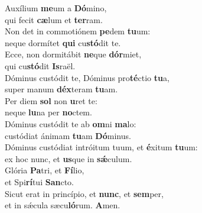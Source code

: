 \evenverse Auxílium \textbf{me}um a \textbf{Dó}mino,~\*\\
\evenverse qui fecit \textbf{cæ}lum et \textbf{ter}ram.\\
\oddverse Non det in commotiónem \textbf{pe}dem \textbf{tu}um:~\*\\
\oddverse neque dormítet \textbf{qui} cu\textbf{stó}dit te.\\
\evenverse Ecce, non dormitábit \textbf{ne}que \textbf{dór}miet,~\*\\
\evenverse qui cu\textbf{stó}dit \textbf{Is}raël.\\
\oddverse Dóminus custódit te, Dóminus pro\textbf{té}ctio \textbf{tu}a,~\*\\
\oddverse super manum \textbf{déx}teram \textbf{tu}am.\\
\evenverse Per diem \textbf{sol} non \textbf{u}ret te:~\*\\
\evenverse neque \textbf{lu}na per \textbf{no}ctem.\\
\oddverse Dóminus custódit te ab \textbf{om}ni \textbf{ma}lo:~\*\\
\oddverse custódiat ánimam \textbf{tu}am \textbf{Dó}minus.\\
\evenverse Dóminus custódiat intróitum tuum, et \textbf{é}xitum \textbf{tu}um:~\*\\
\evenverse ex hoc nunc, et \textbf{us}que in \textbf{sǽ}culum.\\
\oddverse Glória \textbf{Pa}tri, et \textbf{Fí}lio,~\*\\
\oddverse et Spi\textbf{rí}tui \textbf{San}cto.\\
\evenverse Sicut erat in princípio, et \textbf{nunc}, et \textbf{sem}per,~\*\\
\evenverse et in sǽcula sæcu\textbf{ló}rum. \textbf{A}men.\\
